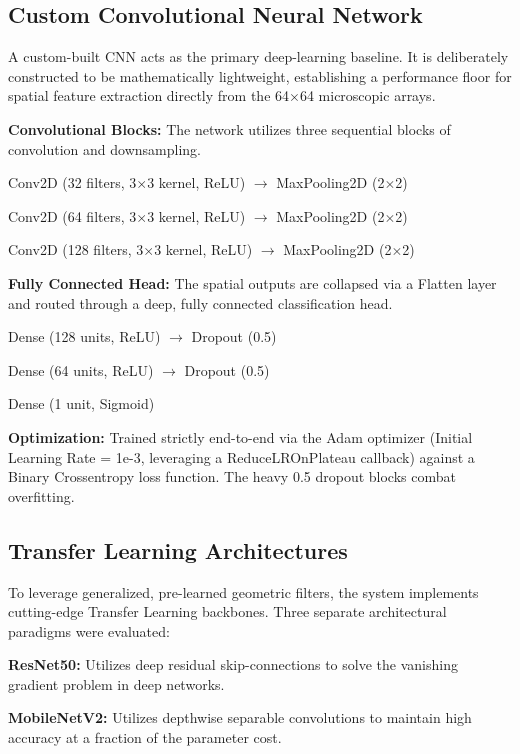 \subsection{Custom Convolutional Neural Network}

A custom-built CNN acts as the primary deep-learning baseline. It is deliberately constructed to be mathematically lightweight, establishing a performance floor for spatial feature extraction directly from the 64$\times$64 microscopic arrays.

\noindent\textbf{Convolutional Blocks:} The network utilizes three sequential blocks of convolution and downsampling.

Conv2D (32 filters, 3$\times$3 kernel, ReLU) $\rightarrow$ MaxPooling2D (2$\times$2)

Conv2D (64 filters, 3$\times$3 kernel, ReLU) $\rightarrow$ MaxPooling2D (2$\times$2)

Conv2D (128 filters, 3$\times$3 kernel, ReLU) $\rightarrow$ MaxPooling2D (2$\times$2)

\noindent\textbf{Fully Connected Head:} The spatial outputs are collapsed via a Flatten layer and routed through a deep, fully connected classification head.

Dense (128 units, ReLU) $\rightarrow$ Dropout (0.5)

Dense (64 units, ReLU) $\rightarrow$ Dropout (0.5)

Dense (1 unit, Sigmoid)

\noindent\textbf{Optimization:} Trained strictly end-to-end via the Adam optimizer (Initial Learning Rate = 1e-3, leveraging a ReduceLROnPlateau callback) against a Binary Crossentropy loss function. The heavy 0.5 dropout blocks combat overfitting.

\subsection{Transfer Learning Architectures}

To leverage generalized, pre-learned geometric filters, the system implements cutting-edge Transfer Learning backbones. Three separate architectural paradigms were evaluated:

\noindent\textbf{ResNet50:} Utilizes deep residual skip-connections to solve the vanishing gradient problem in deep networks.

\noindent\textbf{MobileNetV2:} Utilizes depthwise separable convolutions to maintain high accuracy at a fraction of the parameter cost.

